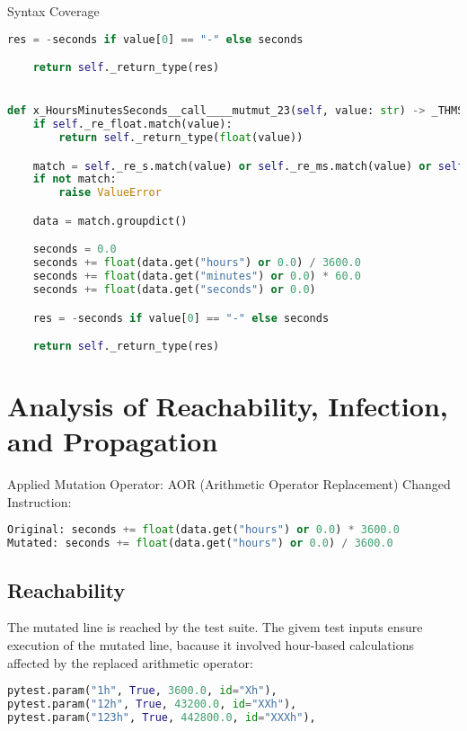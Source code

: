 \documentclass[a4paper]{scrreprt}
\newcounter{question}
\begin{document}
\begin{question}{Syntax Coverage}
\begin{enumerate}[topsep=0pt, leftmargin=*]
\begin{answer}
\begin{lstlisting}[language=Python, caption={mutated tests for \texttt{\_HoursMinutesSeconds\_\_call\_\_} by Maxim Zilke}, label={lst:hoursminutes-call}]
    res = -seconds if value[0] == "-" else seconds

    return self._return_type(res)


def x_HoursMinutesSeconds__call____mutmut_23(self, value: str) -> _THMS:
    if self._re_float.match(value):
        return self._return_type(float(value))

    match = self._re_s.match(value) or self._re_ms.match(value) or self._re_hms.match(value)
    if not match:
        raise ValueError

    data = match.groupdict()

    seconds = 0.0
    seconds += float(data.get("hours") or 0.0) / 3600.0
    seconds += float(data.get("minutes") or 0.0) * 60.0
    seconds += float(data.get("seconds") or 0.0)

    res = -seconds if value[0] == "-" else seconds

    return self._return_type(res)
\end{lstlisting}



\section*{Analysis of Reachability, Infection, and Propagation}

Applied Mutation Operator: AOR (Arithmetic Operator Replacement)
Changed Instruction:

\begin{lstlisting}[language=Python, caption={original and mutated code}]
Original: seconds += float(data.get("hours") or 0.0) * 3600.0
Mutated: seconds += float(data.get("hours") or 0.0) / 3600.0
\end{lstlisting}


\subsection*{Reachability}

The mutated line is reached by the test suite. The givem test inputs ensure execution of the mutated line, bacause it involved hour-based calculations affected by the replaced arithmetic operator:

\begin{lstlisting}[language=python]
pytest.param("1h", True, 3600.0, id="Xh"),
pytest.param("12h", True, 43200.0, id="XXh"),
pytest.param("123h", True, 442800.0, id="XXXh"),
\end{lstlisting}




\end{answer}
\end{enumerate}
\end{question}
\end{document}
